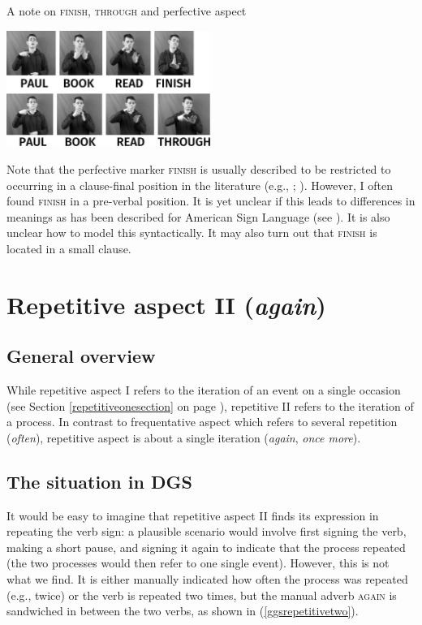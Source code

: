 \begin{digression}{{A note on \textsc{finish}, \textsc{through} and perfective aspect}}{}
\begin{center}
	\includegraphics[width=0.5\textwidth]{fertigunddurchsw.jpg}
	\end{center}
\vspace{0.2cm}

\noindent Note that the perfective marker \textsc{finish} is usually described to be restricted to occurring in a clause-final position in the literature (e.g., \citealt[3]{pfau2004grammaticalization}; \citealt[261--262]{rathmann2005event}). However, I often found \textsc{finish} in a pre-verbal position. It is yet unclear if this leads to differences in meanings as has been described for American Sign Language (see \citealt{rathmann2005event}). It is also unclear how to model this syntactically. It may also turn out that \textsc{finish} is located in a small clause.
\end{digression}




\section{Repetitive aspect II (\textit{again})}\label{repetitivetwo}
\subsection{General overview}
While repetitive aspect I refers to the iteration of an event on a single occasion (see Section \ref{repetitiveonesection} on page \pageref{repetitiveonesection}), repetitive II refers to the iteration of a process. In contrast to frequentative aspect which refers to several repetition (\textit{often}), repetitive aspect is about a single iteration (\textit{again}, \textit{once more}). 

\subsection{The situation in DGS}
It would be easy to imagine that repetitive aspect II finds its expression in repeating the verb sign: a plausible scenario would involve first signing the verb, making a short pause, and signing it again to indicate that the process repeated (the two processes would  then refer to one single event). However, this is not what we find. It is either manually indicated how often the process was repeated (e.g., twice) or the verb is repeated two times, but the manual adverb \textsc{again} is sandwiched in between the two verbs, as shown in (\ref{ggsrepetitivetwo}).


